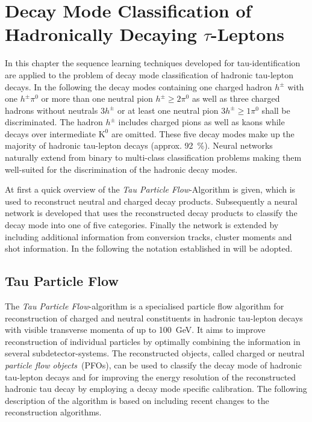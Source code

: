 \chapter{Decay Mode Classification of Hadronically Decaying $\tau$-Leptons}
\label{sec:decaymode}

In this chapter the sequence learning techniques developed for
tau-identification are applied to the problem of decay mode classification of
hadronic tau-lepton decays. In the following the decay modes containing one
charged hadron $h^\pm$ with one $h^\pm \pi^0$ or more than one neutral pion
$h^\pm \geq 2\pi^0$ as well as three charged hadrons without neutrals $3h^\pm$
or at least one neutral pion $3h^\pm \geq 1\pi^0$ shall be discriminated. The
hadron $h^\pm$ includes charged pions as well as kaons while decays over
intermediate $\text{K}^0$ are omitted. These five decay modes make up the
majority of hadronic tau-lepton decays (approx. \SI{92}{\percent}). Neural
networks naturally extend from binary to multi-class classification problems
making them well-suited for the discrimination of the hadronic decay modes.

At first a quick overview of the \emph{Tau Particle Flow}-Algorithm is given,
which is used to reconstruct neutral and charged decay products. Subsequently a
neural network is developed that uses the reconstructed decay products to
classify the decay mode into one of five categories. Finally the network is
extended by including additional information from conversion tracks, cluster
moments and shot information. In the following the notation established in
\cite{atlas:taurec:decaymodes} will be adopted.


\section{Tau Particle Flow}
\label{sec:tau_pflow}

The \emph{Tau Particle Flow}-algorithm is a specialised particle flow algorithm
for reconstruction of charged and neutral constituents in hadronic tau-lepton
decays with visible transverse momenta of up to \SI{100}{\giga\electronvolt}. It
aims to improve reconstruction of individual particles by optimally combining
the information in several subdetector-systems. The reconstructed objects,
called charged or neutral \emph{particle flow objects}~(PFOs), can be used to
classify the decay mode of hadronic tau-lepton decays and for improving the
energy resolution of the reconstructed hadronic tau decay by employing a decay
mode specific calibration. The following description of the algorithm is based
on \cite{atlas:taurec:decaymodes} including recent changes to the reconstruction
algorithms.

